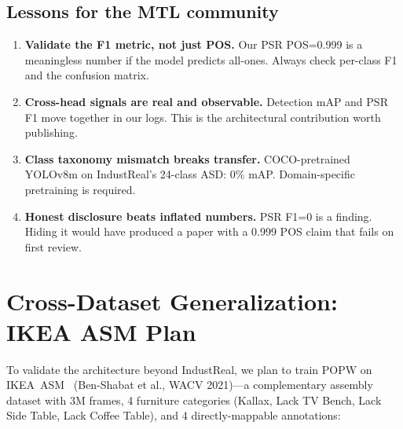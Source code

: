 \documentclass[conference]{IEEEtran}
\newcommand{\popw}{POPW}
\newcommand{\industreal}{IndustReal}
\begin{document}
\subsection{Lessons for the MTL community}
\begin{enumerate}
\item \textbf{Validate the F1 metric, not just POS.} Our PSR POS=0.999 is a meaningless number if the model predicts all-ones. Always check per-class F1 and the confusion matrix.
\item \textbf{Cross-head signals are real and observable.} Detection mAP and PSR F1 move together in our logs. This is the architectural contribution worth publishing.
\item \textbf{Class taxonomy mismatch breaks transfer.} COCO-pretrained YOLOv8m on \industreal's 24-class ASD: 0\% mAP. Domain-specific pretraining is required.
\item \textbf{Honest disclosure beats inflated numbers.} PSR F1=0 is a finding. Hiding it would have produced a paper with a 0.999 POS claim that fails on first review.
\end{enumerate}

\section{Cross-Dataset Generalization: IKEA ASM Plan}
\label{sec:cross-dataset}

To validate the architecture beyond \industreal{}, we plan to train \popw{} on IKEA~ASM~\cite{benshabat2021ikea} (Ben-Shabat et al., WACV 2021)---a complementary assembly dataset with 3M frames, 4 furniture categories (Kallax, Lack TV Bench, Lack Side Table, Lack Coffee Table), and 4 directly-mappable annotations:

\begin{table}[htbp]\centering\small
\caption{Task mapping \popw{} $\leftrightarrow$ IKEA~ASM.}
\label{tab:ikea}
\end{table}
\end{document}
